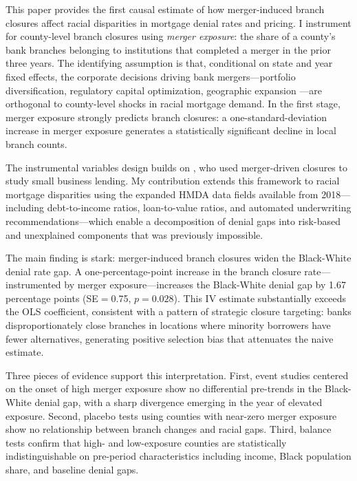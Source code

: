 \documentclass[12pt]{article}
\begin{document}
This paper provides the first causal estimate of how merger-induced branch closures affect racial disparities in mortgage denial rates and pricing. I instrument for county-level branch closures using \emph{merger exposure}: the share of a county's bank branches belonging to institutions that completed a merger in the prior three years. The identifying assumption is that, conditional on state and year fixed effects, the corporate decisions driving bank mergers---portfolio diversification, regulatory capital optimization, geographic expansion \citep{erel2011}---are orthogonal to county-level shocks in racial mortgage demand. In the first stage, merger exposure strongly predicts branch closures: a one-standard-deviation increase in merger exposure generates a statistically significant decline in local branch counts.

The instrumental variables design builds on \citet{nguyen2019}, who used merger-driven closures to study small business lending. My contribution extends this framework to racial mortgage disparities using the expanded HMDA data fields available from 2018---including debt-to-income ratios, loan-to-value ratios, and automated underwriting recommendations---which enable a decomposition of denial gaps into risk-based and unexplained components that was previously impossible.

The main finding is stark: merger-induced branch closures widen the Black-White denial rate gap. A one-percentage-point increase in the branch closure rate---instrumented by merger exposure---increases the Black-White denial gap by 1.67 percentage points (SE$=$0.75, $p=0.028$). This IV estimate substantially exceeds the OLS coefficient, consistent with a pattern of strategic closure targeting: banks disproportionately close branches in locations where minority borrowers have fewer alternatives, generating positive selection bias that attenuates the naive estimate.

Three pieces of evidence support this interpretation. First, event studies centered on the onset of high merger exposure show no differential pre-trends in the Black-White denial gap, with a sharp divergence emerging in the year of elevated exposure. Second, placebo tests using counties with near-zero merger exposure show no relationship between branch changes and racial gaps. Third, balance tests confirm that high- and low-exposure counties are statistically indistinguishable on pre-period characteristics including income, Black population share, and baseline denial gaps.
\end{document}
